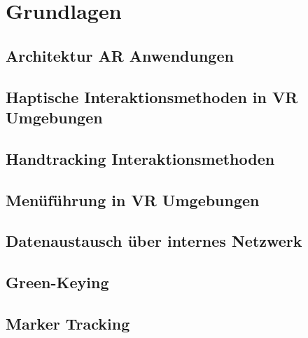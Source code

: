 \section{Grundlagen}
\subsection{Architektur AR Anwendungen}
\subsection{Haptische Interaktionsmethoden in VR Umgebungen}
\subsection{Handtracking Interaktionsmethoden}
\subsection{Menüführung in VR Umgebungen}
\subsection{Datenaustausch über internes Netzwerk}

\subsection{Green-Keying}\label{sec:Green-Keying}
\subsection{Marker Tracking} \label{sec:MarkerTracking}

